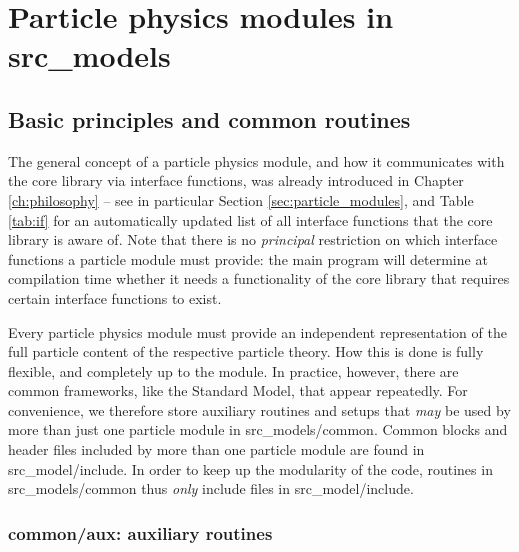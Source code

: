 \documentclass[a4paper,10pt,oneside]{book}
\newcommand{\comment}[1]{}
\newcommand{\code}[1]{\ft{#1}}
\newcommand{\ft}[1]{\textsf{#1}}
\begin{document}
\part{Particle physics modules in src\_models}

\chapter{Basic principles and common routines}

The general concept of  a particle physics module, and how it communicates with the \code{core}
library via interface functions, was already introduced in Chapter \ref{ch:philosophy} -- see in particular
Section \ref{sec:particle_modules}, and Table \ref{tab:if} for an automatically updated list of all interface 
functions that the \code{core} library is aware of. Note that there is no {\it principal} restriction on 
which interface functions a particle module must provide: the main program will determine
at compilation time whether it needs a functionality of the \code{core} library that requires 
certain interface functions to exist.

Every particle physics module must provide an independent representation of the
full particle content of the respective particle theory. How this is done is fully flexible, and 
completely up to the module. In practice, however, there are common frameworks,
like the Standard Model, that appear repeatedly. For convenience, we therefore store auxiliary 
routines and setups that {\it may} be used by more than just one particle module in 
\code{src\_models/common}. Common blocks and header files included by more than one
particle module are found in \code{src\_model/include}. In order to keep up the modularity
of the code, routines in \code{src\_models/common} thus {\it only} include files in 
\code{src\_model/include}.

\comment{The subsections below should probably be automatically harvested -- but this does not work (yet)...}


\section{\code{common/aux}: auxiliary routines}
\end{document}
